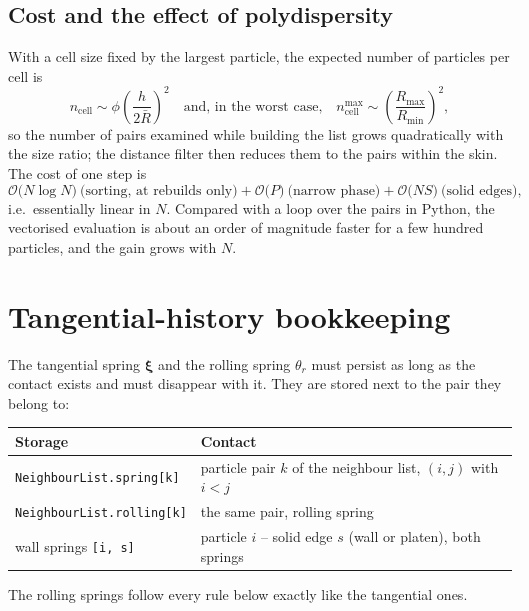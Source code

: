 \subsection{Cost and the effect of polydispersity}

With a cell size fixed by the largest particle, the expected number of particles
per cell is
\begin{equation}
  n_{\text{cell}} \sim \phi \left(\frac{h}{2\bar{R}}\right)^{2}
  \quad\text{and, in the worst case,}\quad
  n_{\text{cell}}^{\max} \sim
  \left(\frac{R_{\max}}{R_{\min}}\right)^{2},
\end{equation}
so the number of pairs examined while building the list grows quadratically
with the size ratio; the distance filter then reduces them to the pairs within
the skin.  The cost of one step is
\begin{equation}
  \mathcal{O}\bigl(N\log N\bigr)\ \text{(sorting, at rebuilds only)}
  + \mathcal{O}\bigl(P\bigr)\ \text{(narrow phase)}
  + \mathcal{O}\bigl(N S\bigr)\ \text{(solid edges)},
\end{equation}
i.e.\ essentially linear in $N$.  Compared with a loop over the pairs in Python,
the vectorised evaluation is about an order of magnitude faster for a few
hundred particles, and the gain grows with $N$.

\section{Tangential-history bookkeeping}
\label{sec:history}

The tangential spring $\boldsymbol{\xi}$ and the rolling spring $\theta_{r}$
must persist as long as the contact exists and must disappear with it.  They
are stored next to the pair they belong to:
\begin{center}
\begin{tabular}{ll}
  \toprule
  Storage & Contact \\
  \midrule
  \texttt{NeighbourList.spring[k]} & particle pair $k$ of the neighbour list, $(i,j)$ with $i<j$ \\
  \texttt{NeighbourList.rolling[k]} & the same pair, rolling spring \\
  wall springs \texttt{[i, s]} & particle $i$ -- solid edge $s$ (wall or platen), both springs \\
  \bottomrule
\end{tabular}
\end{center}
The rolling springs follow every rule below exactly like the tangential ones.

